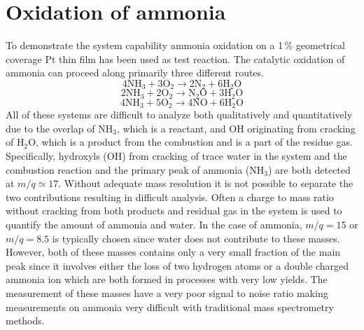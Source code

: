\documentclass[aip,rsi]{revtex4-1}
\begin{document}
\section{Oxidation of ammonia}
To demonstrate the system capability ammonia oxidation on a 1\,\% geometrical coverage Pt thin film has been used as test reaction. The catalytic oxidation of ammonia can proceed along primarily three different routes\cite{Imbihl2007}.
\begin{equation}
4\mathrm{NH}_3+3\mathrm{O}_2\rightarrow 2\mathrm{N}_2 + 6\mathrm{H}_2\mathrm{O}
\label{eq:Pt_clean_combustion}
\end{equation}
\begin{equation}
2\mathrm{NH}_3+2\mathrm{O}_2\rightarrow \mathrm{N}_2\mathrm{O} + 3\mathrm{H}_2\mathrm{O}
\end{equation}
\begin{equation}
4\mathrm{NH}_3+5\mathrm{O}_2\rightarrow 4\mathrm{NO} + 6\mathrm{H}_2\mathrm{O}
\end{equation}
All of these systems are difficult to analyze both qualitatively and quantitatively due to the overlap of NH$_3$, which is a reactant, and OH originating from cracking of H$_2$O, which is a product from the combustion and is a part of the residue gas. Specifically, hydroxyls (OH) from cracking of trace water in the system and the combustion reaction and the primary peak of ammonia (NH$_{3}$) are both detected at $m/q\simeq17$. Without adequate mass resolution it is not possible to separate the two contributions resulting in difficult analysis. Often a charge to mass ratio without cracking from both products and residual gas in the system is used to quantify the amount of ammonia and water. In the case of ammonia, $m/q=15$ or $m/q=8.5$ is typically chosen since water does not contribute to these masses. However, both of these masses contains only a very small fraction of the main peak since it involves either the loss of two hydrogen atoms or a double charged ammonia ion which are both formed in processes with very low yields. The measurement of these masses have a very poor signal to noise ratio making measurements on ammonia very difficult with traditional mass spectrometry methods.
\end{document}

